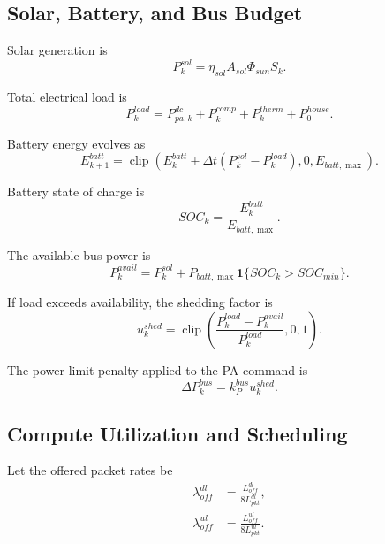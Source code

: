 \documentclass[11pt]{article}
\newcommand{\clip}{\operatorname{clip}}
\begin{document}
\subsection{Solar, Battery, and Bus Budget}

Solar generation is
\begin{equation}
  P^{sol}_k = \eta_{sol} A_{sol} \Phi_{sun} S_k.
\end{equation}

Total electrical load is
\begin{equation}
  P^{load}_k
  =
  P^{dc}_{pa,k}
  + P^{comp}_k
  + P^{therm}_k
  + P^{house}_0.
\end{equation}

Battery energy evolves as
\begin{equation}
  E^{batt}_{k+1}
  =
  \clip\left(
    E^{batt}_k + \Delta t (P^{sol}_k - P^{load}_k),
    0,
    E_{batt,\max}
  \right).
\end{equation}

Battery state of charge is
\begin{equation}
  SOC_k = \frac{E^{batt}_k}{E_{batt,\max}}.
\end{equation}

The available bus power is
\begin{equation}
  P^{avail}_k
  =
  P^{sol}_k
  + P_{batt,\max}\mathbf{1}\{SOC_k > SOC_{min}\}.
\end{equation}

If load exceeds availability, the shedding factor is
\begin{equation}
  u^{shed}_k
  =
  \clip\left(
    \frac{P^{load}_k - P^{avail}_k}{P^{load}_k},
    0,
    1
  \right).
\end{equation}

The power-limit penalty applied to the PA command is
\begin{equation}
  \Delta P^{bus}_k = k^{bus}_P u^{shed}_k.
\end{equation}

\subsection{Compute Utilization and Scheduling}

Let the offered packet rates be
\begin{align}
  \lambda^{dl}_{off}
  &=
  \frac{L^{dl}_{off}}{8L^{dl}_{pkt}}, \\
  \lambda^{ul}_{off}
  &=
  \frac{L^{ul}_{off}}{8L^{ul}_{pkt}}.
\end{align}
\end{document}
